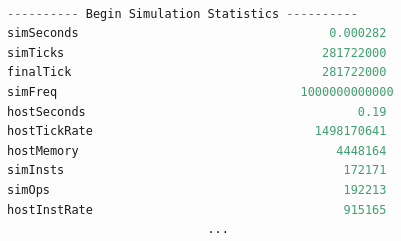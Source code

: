 \begin{lstlisting}[language=python, caption={Sample Statistics}, label={lst:gem5_stats}]

---------- Begin Simulation Statistics ----------
simSeconds                                   0.000282                       # Number of seconds simulated (Second)
simTicks                                    281722000                       # Number of ticks simulated (Tick)
finalTick                                   281722000                       # Number of ticks from beginning of simulation (restored from checkpoints and never reset) (Tick)
simFreq                                  1000000000000                       # The number of ticks per simulated second ((Tick/Second))
hostSeconds                                      0.19                       # Real time elapsed on the host (Second)
hostTickRate                               1498170641                       # The number of ticks simulated per host second (ticks/s) ((Tick/Second))
hostMemory                                    4448164                       # Number of bytes of host memory used (Byte)
simInsts                                       172171                       # Number of instructions simulated (Count)
simOps                                         192213                       # Number of ops (including micro ops) simulated (Count)
hostInstRate                                   915165                       # Simulator instruction rate (inst/s) ((Count/Second))
                            ...
\end{lstlisting}


